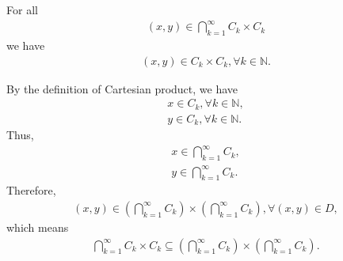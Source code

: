 \documentclass[UTF8,a4paper,10pt]{article}
\begin{document}
\begin{solution}
For all
    \begin{equation*}
      \begin{aligned}
          (x,y)\in\bigcap_{k=1}^{\infty} C_k \times C_k
      \end{aligned}
    \end{equation*}
    we have
    \begin{equation*}
      \begin{aligned}
        (x,y)\in C_k \times C_k, \forall k \in \mathbb{N}.
      \end{aligned}
    \end{equation*}

    By the definition of Cartesian product, we have
    \begin{equation*}
      \begin{aligned}
        x\in C_k, \forall k \in \mathbb{N},\\
        y\in C_k, \forall k \in \mathbb{N}.
      \end{aligned}
    \end{equation*}
    Thus,
    \begin{equation*}
      \begin{aligned}
        x\in \bigcap_{k=1}^{\infty} C_k,\\
        y\in \bigcap_{k=1}^{\infty} C_k.
      \end{aligned}
    \end{equation*}
    Therefore,
    \begin{equation*}
      \begin{aligned}
        (x,y)\in \left(\bigcap_{k=1}^{\infty} C_k\right) \times \left(\bigcap_{k=1}^{\infty} C_k\right),\forall (x,y)\in D,
      \end{aligned}
    \end{equation*}
    which means
    \begin{equation*}
      \begin{aligned}
        \bigcap_{k=1}^{\infty} C_k \times C_k \subseteq  \left(\bigcap_{k=1}^{\infty} C_k\right) \times \left(\bigcap_{k=1}^{\infty} C_k\right).
      \end{aligned}
    \end{equation*}



\end{solution}
\end{document}
